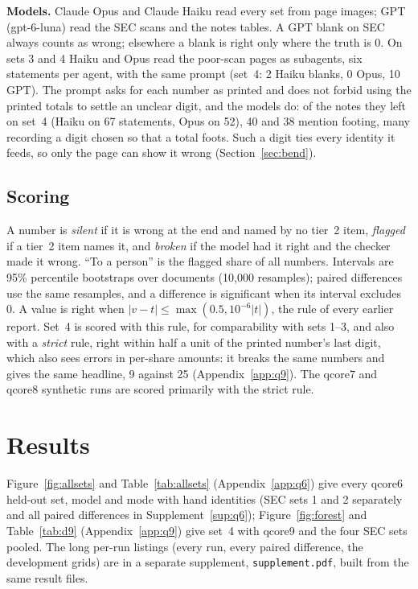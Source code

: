 \documentclass[10pt,twocolumn]{article}
\newcommand{\vq}[1]{\textsf{qcore#1}}
\newcommand{\code}[1]{\texttt{\small #1}}
\begin{document}
\textbf{Models.} Claude Opus and Claude Haiku read every set from page images; GPT (gpt-6-luna) read the SEC scans and the notes tables. A GPT blank on SEC always counts as wrong; elsewhere a blank is right only where the truth is 0. On sets 3 and 4 Haiku and Opus read the poor-scan pages as subagents, six statements per agent, with the same prompt (set~4: 2 Haiku blanks, 0 Opus, 10 GPT). The prompt asks for each number as printed and does not forbid using the printed totals to settle an unclear digit, and the models do: of the notes they left on set~4 (Haiku on 67 statements, Opus on 52), 40 and 38 mention footing, many recording a digit chosen so that a total foots. Such a digit ties every identity it feeds, so only the page can show it wrong (Section~\ref{sec:bend}).

\subsection{Scoring}\label{sec:scoring}
A number is \emph{silent} if it is wrong at the end and named by no tier~2 item, \emph{flagged} if a tier~2 item names it, and \emph{broken} if the model had it right and the checker made it wrong. ``To a person'' is the flagged share of all numbers. Intervals are 95\% percentile bootstraps over documents (10,000 resamples); paired differences use the same resamples, and a difference is significant when its interval excludes 0. A value is right when $|v-t|\le\max(0.5,10^{-6}|t|)$, the rule of every earlier report. Set~4 is scored with this rule, for comparability with sets 1--3, and also with a \emph{strict} rule, right within half a unit of the printed number's last digit, which also sees errors in per-share amounts: it breaks the same numbers and gives the same headline, 9 against 25 (Appendix~\ref{app:q9}). The \vq{7} and \vq{8} synthetic runs are scored primarily with the strict rule.

\section{Results}\label{sec:results}

Figure~\ref{fig:allsets} and Table~\ref{tab:allsets} (Appendix~\ref{app:q6}) give every \vq{6} held-out set, model and mode with hand identities (SEC sets 1 and 2 separately and all paired differences in Supplement~\ref{sup:q6}); Figure~\ref{fig:forest} and Table~\ref{tab:d9} (Appendix~\ref{app:q9}) give set~4 with \vq{9} and the four SEC sets pooled. The long per-run listings (every run, every paired difference, the development grids) are in a separate supplement, \code{supplement.pdf}, built from the same result files.
\end{document}
